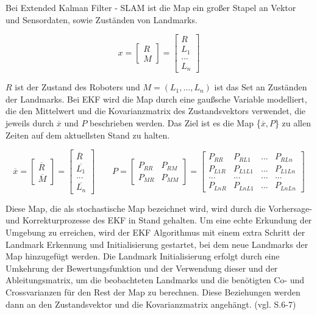 Bei Extended Kalman Filter - SLAM ist die Map ein großer Stapel an Vektor und Sensordaten, sowie Zuständen von Landmarks.

\begin{equation}
  x =  \begin{bmatrix}
		R\\
		M
     	\end{bmatrix}
     = \begin{bmatrix}
		R\\
		L_1\\
		...\\
		L_n
     	\end{bmatrix}
\end{equation}

\( R\) ist der Zustand des Roboters und \( M = (L_1, ..., L_n)\)  ist das Set an Zuständen der Landmarks.
Bei EKF wird die Map durch eine gaußsche Variable modelliert, die den Mittelwert und die Kovarianzmatrix des Zustandsvektors verwendet, die jeweils durch \(\overline{x}\) und \(P\) beschrieben werden. Das Ziel ist es die Map \{\(\overline{x}, P\)\} zu allen Zeiten auf dem aktuellsten Stand zu halten.


\begin{equation}
  \overline{x} =  
  		\begin{bmatrix}
		\overline{R}\\
		\overline{M}
     	\end{bmatrix}
     = 
     	\begin{bmatrix}
		\overline{R}\\
		\overline{L_1}\\
		...\\
		\overline{L_n}
     	\end{bmatrix}
     	\quad\quad
     P = 
     	\begin{bmatrix}
		P_{RR} & P_{RM}\\
		P_{MR} & P_{MM}
     	\end{bmatrix}
     = 
     	\begin{bmatrix}
		P_{RR} & P_{RL1} & ... & P_{RLn}\\
		P_{L1R} & P_{L1L1} & ... & P_{L1Ln}\\
		... & ... & ... & ... \\
		P_{LnR} & P_{LnL1} & ... & P_{LnLn}
     	\end{bmatrix}
\end{equation}

Diese Map, die als stochastische Map bezeichnet wird, wird durch die Vorhersage- und Korrekturprozesse des EKF in Stand gehalten. Um eine echte Erkundung der Umgebung zu erreichen, wird der EKF Algorithmus mit einem extra Schritt der Landmark Erkennung und Initialisierung gestartet, bei dem neue Landmarks der Map hinzugefügt werden. Die Landmark Initialisierung erfolgt durch eine Umkehrung der Bewertungsfunktion und der Verwendung dieser und der Ableitungsmatrix, um die beobachteten Landmarks und die benötigten Co- und Crossvarianzen für den Rest der Map zu berechnen. Diese Beziehungen werden dann an den Zustandsvektor und die Kovarianzmatrix angehängt. (vgl. \cite{ekf_slam} S.6-7)


